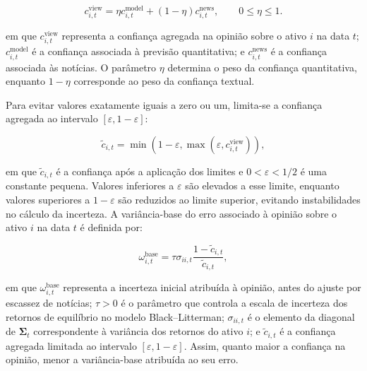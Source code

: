 \begin{equation}
    c_{i,t}^{\mathrm{view}}
    =
    \eta c_{i,t}^{\mathrm{model}}
    +
    (1-\eta)c_{i,t}^{\mathrm{news}},
    \qquad
    0\leq\eta\leq1.
    \label{eq:confianca_agregada}
\end{equation}

\noindent
em que $c_{i,t}^{\mathrm{view}}$ representa a confiança agregada
na opinião sobre o ativo $i$ na data $t$;
$c_{i,t}^{\mathrm{model}}$ é a confiança associada à previsão
quantitativa; e $c_{i,t}^{\mathrm{news}}$ é a confiança associada
às notícias. O parâmetro $\eta$ determina o peso da confiança
quantitativa, enquanto $1-\eta$ corresponde ao peso da
confiança textual.

Para evitar valores exatamente iguais a zero ou um, limita-se
a confiança agregada ao intervalo $[\varepsilon,1-\varepsilon]$:

\begin{equation}
    \widetilde{c}_{i,t}
    =
    \min\left(
        1-\varepsilon,
        \max\left(
            \varepsilon,
            c_{i,t}^{\mathrm{view}}
        \right)
    \right),
    \label{eq:confianca_limitada}
\end{equation}

\noindent em que $\widetilde{c}_{i,t}$ é a confiança após a aplicação
dos limites e $0<\varepsilon<1/2$ é uma constante pequena.
Valores inferiores a $\varepsilon$ são elevados a esse limite,
enquanto valores superiores a $1-\varepsilon$ são reduzidos
ao limite superior, evitando instabilidades no cálculo
da incerteza.
\newpage
A variância-base do erro associado à opinião sobre o ativo $i$
na data $t$ é definida por:

\begin{equation}
    \omega_{i,t}^{\mathrm{base}}
    =
    \tau \sigma_{ii,t}
    \frac{1-\widetilde{c}_{i,t}}
         {\widetilde{c}_{i,t}},
    \label{eq:omega_base}
\end{equation}

\noindent
em que $\omega_{i,t}^{\mathrm{base}}$ representa a incerteza
inicial atribuída à opinião, antes do ajuste por escassez de
notícias; $\tau>0$ é o parâmetro que controla a escala de
incerteza dos retornos de equilíbrio no modelo Black--Litterman;
$\sigma_{ii,t}$ é o elemento da diagonal de
$\boldsymbol{\Sigma}_t$ correspondente à variância dos retornos
do ativo $i$; e $\widetilde{c}_{i,t}$ é a confiança agregada
limitada ao intervalo $[\varepsilon,1-\varepsilon]$.
Assim, quanto maior a confiança na opinião, menor a
variância-base atribuída ao seu erro.

